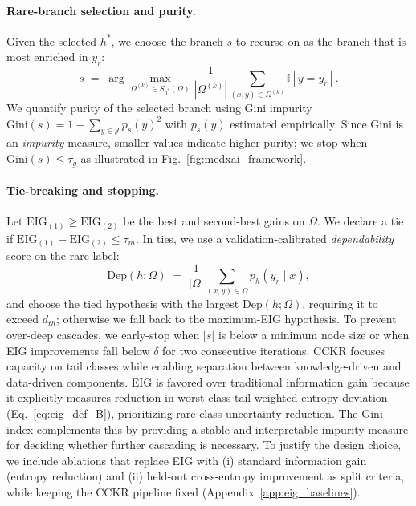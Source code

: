 \documentclass{article}
\begin{document}
\paragraph{Rare-branch selection and purity.}
Given the selected $h^*$, we choose the branch $s$ to recurse on as the branch that is most enriched in $y_r$:
\begin{equation}
s \;=\; \arg\max_{\Omega^{(k)}\in S_{h^*}(\Omega)} \frac{1}{|\Omega^{(k)}|}\sum_{(x,y)\in\Omega^{(k)}}\mathbb{I}[y=y_r].
\end{equation}
We quantify purity of the selected branch using Gini impurity
$\mathrm{Gini}(s)=1-\sum_{y\in\mathcal{Y}}p_s(y)^2$ with $p_s(y)$ estimated empirically.
Since Gini is an \emph{impurity} measure, smaller values indicate higher purity; we stop when $\mathrm{Gini}(s)\le \tau_g$ as illustrated in Fig.~\ref{fig:medxai_framework}.

\paragraph{Tie-breaking and stopping.}
Let $\mathrm{EIG}_{(1)}\ge \mathrm{EIG}_{(2)}$ be the best and second-best gains on $\Omega$.
We declare a tie if $\mathrm{EIG}_{(1)}-\mathrm{EIG}_{(2)}\le \tau_m$.
In ties, we use a validation-calibrated \emph{dependability} score on the rare label:
\begin{equation}
\mathrm{Dep}(h;\Omega)
\;=\;
\frac{1}{|\Omega|}\sum_{(x,y)\in\Omega} p_h(y_r\mid x),
\end{equation}
and choose the tied hypothesis with the largest $\mathrm{Dep}(h;\Omega)$, requiring it to exceed $d_{th}$; otherwise we fall back to
the maximum-EIG hypothesis.
To prevent over-deep cascades, we early-stop when $|s|$ is below a minimum node size or when EIG improvements fall below $\delta$
for two consecutive iterations.
CCKR focuses capacity on tail classes while enabling separation between knowledge-driven and data-driven components.
EIG is favored over traditional information gain because it explicitly measures reduction in worst-class tail-weighted entropy deviation
(Eq.~\eqref{eq:eig_def_B}), prioritizing rare-class uncertainty reduction. The Gini index complements this by providing a stable and interpretable
impurity measure for deciding whether further cascading is necessary. To justify the design choice, we include ablations that replace EIG with (i) standard information gain (entropy reduction) and (ii) held-out cross-entropy improvement as split criteria, while keeping the CCKR pipeline fixed (Appendix~\ref{app:eig_baselines}).
\end{document}
